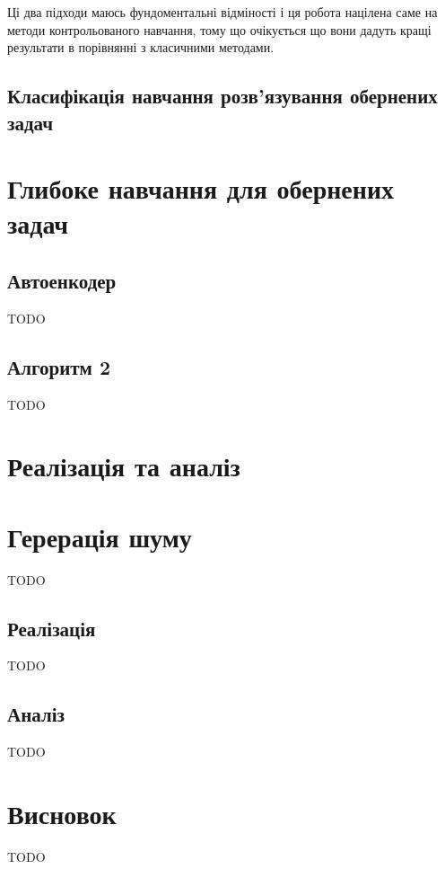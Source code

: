 \documentclass[14pt,a4paper]{extarticle}
\newcounter{e}
\numberwithin{equation}{section}
\numberwithin{figure}{section}
\begin{document}
	Ці два підходи маюсь фундоментальні відміності і ця робота націлена саме на методи контрольованого навчання, тому що очікується що вони дадуть кращі результати в порівнянні з класичними методами. 
	
	\subsection{Класифікація навчання розв'язування обернених задач}
	
	\newpage
	\thispagestyle{empty}
	\section{Глибоке навчання для обернених задач}
	
	\subsection{Автоенкодер}
	TODO

	\subsection{Алгоритм 2}
	TODO


	\newpage
	\thispagestyle{empty}
	\section{Реалізація та аналіз}
	
	\section{Герерація шуму}
	TODO
	
	\subsection{Реалізація}
	TODO

	\subsection{Аналіз}
	TODO
	
	\newpage
	\thispagestyle{empty}
	\section{Висновок}
	TODO
	
	\newpage
	\thispagestyle{empty}
	
	\nocite{ongie2020deep}
		
	\nocite{Adler_2017}
	\printbibliography[title={Бібліографія}]
\end{document}
